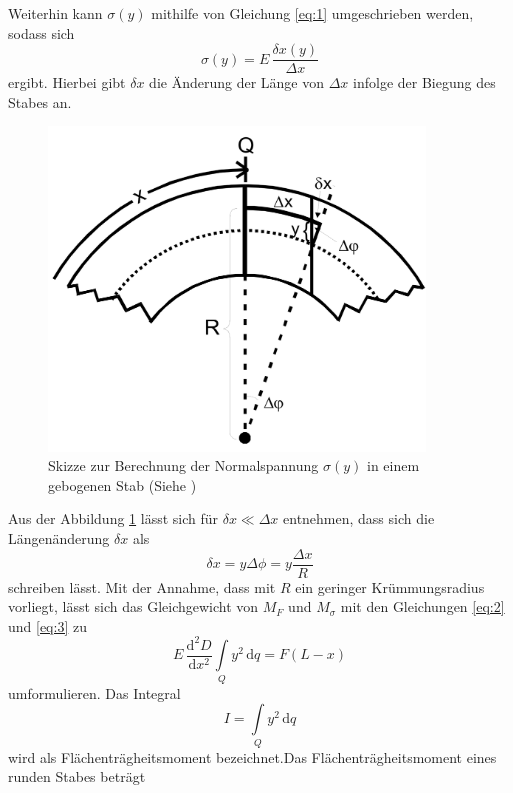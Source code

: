 Weiterhin kann $\sigma (y)$
mithilfe von Gleichung \ref{eq:1} umgeschrieben werden,
sodass sich 
\begin{equation}
    \sigma (y) = E \, \frac{\delta x(y)}{\Delta x}
    \label{eq:4}
\end{equation}
\noindent ergibt. Hierbei gibt $\delta x$ die 
Änderung der Länge von $\Delta x$ infolge der
Biegung des Stabes an.
 

\begin{figure}[h]
    \centering
    \includegraphics[width=10cm]{Theorie4.png}
    \caption{Skizze zur Berechnung der Normalspannung $\sigma (y)$ in einem gebogenen Stab (Siehe \cite{sample})}
    \label{fig:theorie4}
\end{figure}

\noindent
Aus der Abbildung \ref{fig:theorie4} lässt sich für 
$\delta x \ll \Delta x$ entnehmen, dass sich 
die Längenänderung $\delta x$ als 
\begin{equation}
    \delta x = y \Delta \phi = y \frac{\Delta x}{R}
    \label{eq:5}
\end{equation}
\noindent schreiben lässt. Mit der Annahme, dass mit 
$R$ ein geringer Krümmungsradius vorliegt, lässt sich
das Gleichgewicht von $M_F$ und $M_{\sigma}$ mit den
Gleichungen \ref{eq:2} und \ref{eq:3} zu 
\begin{equation}
    E\, \frac{\mathrm{d}^2 D}{\mathrm{d} x^2} \int\limits_Q \! y^2\, \mathrm{d}q = F(L-x)
    \label{eq:6}
\end{equation}
\noindent umformulieren. Das Integral
\begin{equation}
    I = \int\limits_Q \! y^2\, \mathrm{d}q
    \label{eq:7}
\end{equation}
\noindent wird als Flächenträgheitsmoment bezeichnet.Das Flächenträgheitsmoment eines runden Stabes beträgt

